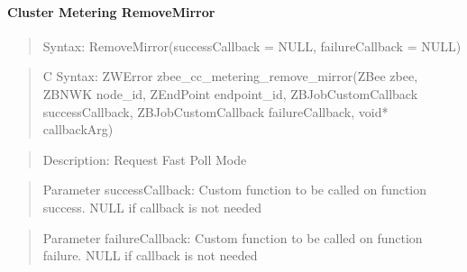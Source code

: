\paragraph{Cluster Metering RemoveMirror}
\begin{quote}Syntax: RemoveMirror(successCallback = NULL, failureCallback = NULL)\end{quote}
\begin{quote}C Syntax: ZWError zbee\_cc\_metering\_remove\_mirror(ZBee zbee, ZBNWK node\_id, ZEndPoint endpoint\_id, ZBJobCustomCallback successCallback, ZBJobCustomCallback failureCallback, void* callbackArg)\end{quote}
\begin{quote}Description: Request Fast Poll Mode\end{quote}
\begin{quote}Parameter successCallback: Custom function to be called on function success. NULL if callback is not needed\end{quote}
\begin{quote}Parameter failureCallback: Custom function to be called on function failure. NULL if callback is not needed\end{quote}


